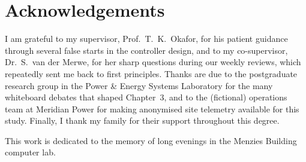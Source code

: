 \chapter*{Acknowledgements}
I am grateful to my supervisor, Prof.\ T.\ K.\ Okafor, for his patient guidance through several
false starts in the controller design, and to my co-supervisor, Dr.\ S.\ van der Merwe, for
her sharp questions during our weekly reviews, which repeatedly sent me back to first
principles. Thanks are due to the postgraduate research group in the Power \& Energy Systems
Laboratory for the many whiteboard debates that shaped Chapter~3, and to the (fictional)
operations team at Meridian Power for making anonymised site telemetry available for this
study. Finally, I thank my family for their support throughout this degree.

This work is dedicated to the memory of long evenings in the Menzies Building computer lab.

\tableofcontents
\listoffigures
\listoftables
